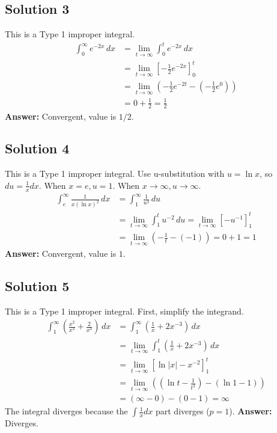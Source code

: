 \documentclass{article}
\begin{document}
\subsection*{Solution 3}
This is a Type 1 improper integral.
\begin{align*}
\int_{0}^{\infty} e^{-2x} \,dx &= \lim_{t \to \infty} \int_{0}^{t} e^{-2x} \,dx \\
&= \lim_{t \to \infty} \left[ -\frac{1}{2}e^{-2x} \right]_{0}^{t} \\
&= \lim_{t \to \infty} \left( -\frac{1}{2}e^{-2t} - \left(-\frac{1}{2}e^{0}\right) \right) \\
&= 0 + \frac{1}{2} = \frac{1}{2}
\end{align*}
\textbf{Answer:} Convergent, value is $1/2$.

\subsection*{Solution 4}
This is a Type 1 improper integral. Use u-substitution with $u=\ln x$, so $du = \frac{1}{x}dx$. When $x=e, u=1$. When $x \to \infty, u \to \infty$.
\begin{align*}
\int_{e}^{\infty} \frac{1}{x (\ln x)^2} \,dx &= \int_{1}^{\infty} \frac{1}{u^2} \,du \\
&= \lim_{t \to \infty} \int_{1}^{t} u^{-2} \,du = \lim_{t \to \infty} \left[ -u^{-1} \right]_{1}^{t} \\
&= \lim_{t \to \infty} \left( -\frac{1}{t} - (-1) \right) = 0+1=1
\end{align*}
\textbf{Answer:} Convergent, value is $1$.

\subsection*{Solution 5}
This is a Type 1 improper integral. First, simplify the integrand.
\begin{align*}
\int_{1}^{\infty} \left(\frac{x^2}{x^3} + \frac{2}{x^3}\right) \,dx &= \int_{1}^{\infty} \left(\frac{1}{x} + 2x^{-3}\right) \,dx \\
&= \lim_{t \to \infty} \int_{1}^{t} \left(\frac{1}{x} + 2x^{-3}\right) \,dx \\
&= \lim_{t \to \infty} \left[ \ln|x| - x^{-2} \right]_{1}^{t} \\
&= \lim_{t \to \infty} \left( (\ln t - \frac{1}{t^2}) - (\ln 1 - 1) \right) \\
&= (\infty - 0) - (0-1) = \infty
\end{align*}
The integral diverges because the $\int \frac{1}{x}dx$ part diverges ($p=1$).
\textbf{Answer:} Diverges.
\end{document}
